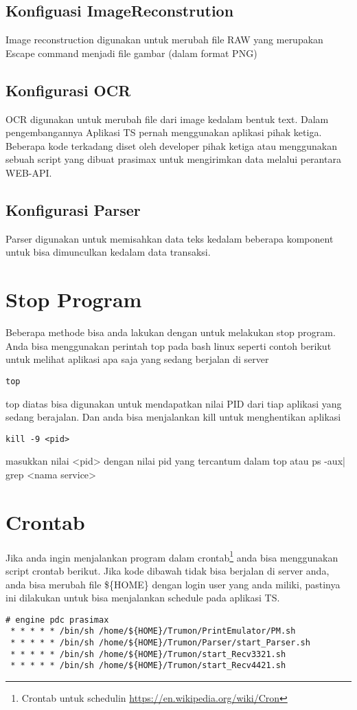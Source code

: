 \documentclass[11pt]{article}
\begin{document}
\subsection{Konfiguasi ImageReconstrution}
\label{sec:org0e625d4}
Image reconstruction digunakan untuk merubah file RAW yang merupakan Escape command menjadi 
file gambar (dalam format PNG)
\subsection{Konfigurasi OCR}
\label{sec:org0b3bbc4}
OCR  digunakan untuk merubah file dari image kedalam bentuk text. Dalam pengembangannya 
Aplikasi TS pernah menggunakan aplikasi pihak ketiga. Beberapa kode terkadang diset oleh 
developer pihak ketiga atau menggunakan sebuah script yang dibuat prasimax untuk mengirimkan
data melalui perantara WEB-API. 
\subsection{Konfigurasi Parser}
\label{sec:orga50f300}
Parser digunakan untuk memisahkan data teks kedalam beberapa komponent untuk bisa dimunculkan 
kedalam data transaksi.
\section{Stop Program}
\label{sec:org2f2eeca}
Beberapa methode bisa anda lakukan dengan untuk melakukan stop program. Anda bisa menggunakan
perintah top pada bash linux seperti contoh berikut untuk melihat aplikasi apa saja yang 
sedang berjalan di server
\begin{verbatim}
top
\end{verbatim}
top diatas bisa digunakan untuk mendapatkan nilai PID dari tiap aplikasi yang sedang berajalan.
Dan anda bisa menjalankan kill untuk menghentikan aplikasi 
\begin{verbatim}
kill -9 <pid>
\end{verbatim}
masukkan nilai <pid> dengan nilai pid yang tercantum dalam top atau ps -aux| grep <nama service>

\section{Crontab}
\label{sec:org407c7ef}
Jika anda ingin menjalankan program dalam crontab\footnote{Crontab untuk schedulin  \url{https://en.wikipedia.org/wiki/Cron}} anda bisa menggunakan script crontab berikut. 
Jika kode dibawah tidak bisa berjalan di server anda, anda bisa merubah file \$\{HOME\}
dengan login user yang anda miliki, pastinya ini dilakukan untuk bisa menjalankan schedule
pada aplikasi TS.
\begin{verbatim}
# engine pdc prasimax
 * * * * * /bin/sh /home/${HOME}/Trumon/PrintEmulator/PM.sh
 * * * * * /bin/sh /home/${HOME}/Trumon/Parser/start_Parser.sh
 * * * * * /bin/sh /home/${HOME}/Trumon/start_Recv3321.sh
 * * * * * /bin/sh /home/${HOME}/Trumon/start_Recv4421.sh
\end{verbatim}
\end{document}
